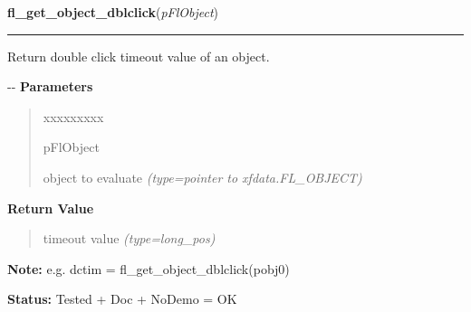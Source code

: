 \hspace{.8\funcindent}\begin{boxedminipage}{\funcwidth}

    \raggedright \textbf{fl\_get\_object\_dblclick}(\textit{pFlObject})

    \vspace{-1.5ex}

    \rule{\textwidth}{0.5\fboxrule}
\setlength{\parskip}{2ex}

Return double click timeout value of an object.

-{}-
\setlength{\parskip}{1ex}
      \textbf{Parameters}
      \vspace{-1ex}

      \begin{quote}
        \begin{Ventry}{xxxxxxxxx}

          \item[pFlObject]


object to evaluate
            {\it (type=pointer to xfdata.FL\_OBJECT)}

        \end{Ventry}

      \end{quote}

      \textbf{Return Value}
    \vspace{-1ex}

      \begin{quote}

timeout value
      {\it (type=long\_pos)}

      \end{quote}

\textbf{Note:} 
e.g. dctim = fl\_get\_object\_dblclick(pobj0)


\textbf{Status:} 
Tested + Doc + NoDemo = OK


    \end{boxedminipage}

    \label{xformslib:flbasic:fl_set_object_geometry}

    \vspace{0.5ex}

